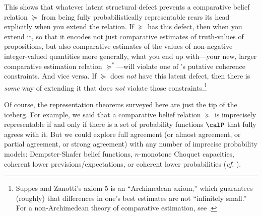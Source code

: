 This shows that whatever latent structural defect prevents a comparative belief relation $\succeq$ from being fully probabilistically representable rears its head explicitly when you extend the relation. If $\succeq$ has this defect, then when you extend it, so that it encodes not just comparative estimates of truth-values of propositions, but also comparative estimates of the values of non-negative integer-valued quantities more generally, what you end up with---your new, larger comparative estimation relation $\succeq^*$---will violate one of \citeauthor{Suppes1976}'s putative coherence constraints. And vice versa. If $\succeq$ does \textit{not} have this latent defect, then there is \textit{some} way of extending it that does \textit{not} violate those constraints.\footnote{Suppes and Zanotti's axiom 5 is an ``Archimedean axiom,'' which guarantees (roughly) that differences in one's best estimates are not ``infinitely small.'' For a non-Archimedean theory of comparative estimation, see \citet{Pederson2014}.}

Of course, the representation theorems surveyed here are just the tip of the iceberg. For example, we said that a comparative belief relation $\succeq$ is imprecisely representable if and only if there is a set of probability functions $\calP$ that fully agrees with it. But we could explore full agreement (or almost agreement, or partial agreement, or strong agreement) with any number of imprecise probability models: Dempster-Shafer belief functions, $n$-monotone Choquet capacities, coherent lower previsions/expectations, or coherent lower probabilities (\textit{cf.} \citealp{Walley1991, Walley2000, Augustin2014, Troffaes2014}).

